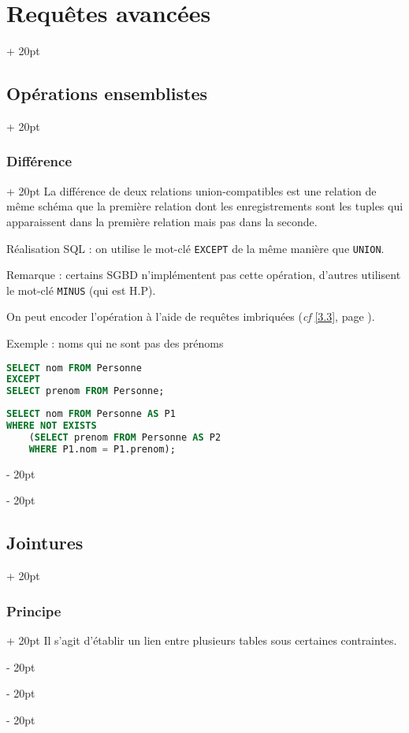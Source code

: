 \documentclass[a4paper, 12pt, twoside]{article}
\newcommand{\ind}[1][20pt]{\advance\leftskip + #1}
\newcommand{\deind}[1][20pt]{\advance\leftskip - #1}
\newenvironment{indt}[2][20pt]{#2 \par \ind[#1]}{\par \deind} %
\begin{document}
\begin{indt}{\section{Requêtes avancées}}
\begin{indt}{\subsection{Opérations ensemblistes}}
            \vspace{12pt}
            
            \begin{indt}{\subsubsection{Différence}}
                La différence de deux relations union-compatibles est une relation de même schéma que la première relation dont les enregistrements sont les tuples qui apparaissent dans la première relation mais pas dans la seconde.

                Réalisation SQL : on utilise le mot-clé \texttt{EXCEPT} de la même manière que \texttt{UNION}.

                Remarque : certains SGBD n'implémentent pas cette opération, d'autres utilisent le mot-clé \texttt{MINUS} (qui est H.P).

                On peut encoder l'opération à l'aide de requêtes imbriquées (\textit{cf} \ref{3.3}, page \pageref{3.3}).

                \vspace{6pt}
                
                Exemple : noms qui ne sont pas des prénoms

                \begin{lstlisting}[language=SQL, xleftmargin=80pt]
SELECT nom FROM Personne
EXCEPT
SELECT prenom FROM Personne;\end{lstlisting}

                \begin{lstlisting}[language=SQL, xleftmargin=80pt]
SELECT nom FROM Personne AS P1
WHERE NOT EXISTS
    (SELECT prenom FROM Personne AS P2
    WHERE P1.nom = P1.prenom);\end{lstlisting}
            \end{indt}
        \end{indt}

        \vspace{12pt}
        
        \begin{indt}{\subsection{Jointures}}
            \label{3.2}

            \begin{indt}{\subsubsection{Principe}}
                Il s'agit d'établir un lien entre plusieurs tables sous certaines contraintes.


\end{indt}
\end{indt}
\end{indt}
\end{document}
